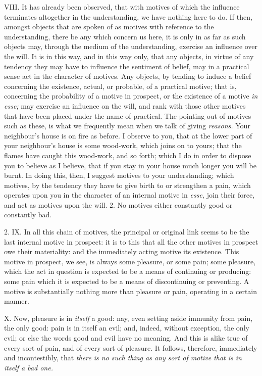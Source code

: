 \documentclass[12pt]{report}
\begin{document}
VIII. It has already been observed, that with motives of which the
influence terminates altogether in the understanding, we have nothing
here to do. If then, amongst objects that are spoken of as motives with
reference to the understanding, there be any which concern us here, it
is only in as far as such objects may, through the medium of the
understanding, exercise an influence over the will. It is in this way,
and in this way only, that any objects, in virtue of any tendency they
may have to influence the sentiment of belief, may in a practical sense
act in the character of motives. Any objects, by tending to induce a
belief concerning the existence, actual, or probable, of a practical
motive; that is, concerning the probability of a motive in prospect, or
the existence of a motive \emph{in esse;} may exercise an influence on
the will, and rank with those other motives that have been placed under
the name of practical. The pointing out of motives such as these, is
what we frequently mean when we talk of giving \emph{reasons.} Your
neighbour's house is on fire as before. I observe to you, that at the
lower part of your neighbour's house is some wood-work, which joins on
to yours; that the flames have caught this wood-work, and so forth;
which I do in order to dispose you to believe as I believe, that if you
stay in your house much longer you will be burnt. In doing this, then, I
suggest motives to your understanding; which motives, by the tendency
they have to give birth to or strengthen a pain, which operates upon you
in the character of an internal motive in \emph{esse,} join their force,
and act as motives upon the will. 2. No motives either constantly good
or constantly bad.

2. IX. In all this chain of motives, the principal or original link
seems to be the last internal motive in prospect: it is to this that all
the other motives in prospect owe their materiality: and the immediately
acting motive its existence. This motive in prospect, we see, is always
some pleasure, or some pain; some pleasure, which the act in question is
expected to be a means of continuing or producing: some pain which it is
expected to be a means of discontinuing or preventing. A motive is
substantially nothing more than pleasure or pain, operating in a certain
manner.

X. Now, pleasure is in \emph{itself} a good: nay, even setting aside
immunity from pain, the only good: pain is in itself an evil; and,
indeed, without exception, the only evil; or else the words good and
evil have no meaning. And this is alike true of every sort of pain, and
of every sort of pleasure. It follows, therefore, immediately and
incontestibly, that \emph{there is no such thing as any sort of motive
that is in itself a bad one.}
\end{document}
